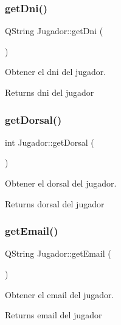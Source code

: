 \subsubsection{\texorpdfstring{get\+Dni()}{getDni()}}
{\footnotesize\ttfamily Q\+String Jugador\+::get\+Dni (\begin{DoxyParamCaption}{ }\end{DoxyParamCaption})}



Obtener el dni del jugador. 

\begin{DoxyReturn}{Returns}
dni del jugador 
\end{DoxyReturn}
\mbox{\label{classJugador_a7f67a27c34f24e618cdbfbebf29b8704}} 
\subsubsection{\texorpdfstring{get\+Dorsal()}{getDorsal()}}
{\footnotesize\ttfamily int Jugador\+::get\+Dorsal (\begin{DoxyParamCaption}{ }\end{DoxyParamCaption})}



Obtener el dorsal del jugador. 

\begin{DoxyReturn}{Returns}
dorsal del jugador 
\end{DoxyReturn}
\mbox{\label{classJugador_ac70026da85dea7d05eaaf8df72c4e8eb}} 
\subsubsection{\texorpdfstring{get\+Email()}{getEmail()}}
{\footnotesize\ttfamily Q\+String Jugador\+::get\+Email (\begin{DoxyParamCaption}{ }\end{DoxyParamCaption})}



Obtener el email del jugador. 

\begin{DoxyReturn}{Returns}
email del jugador 
\end{DoxyReturn}
\mbox{\label{classJugador_a326995f44b24a9a5247144868f2ba359}} 
